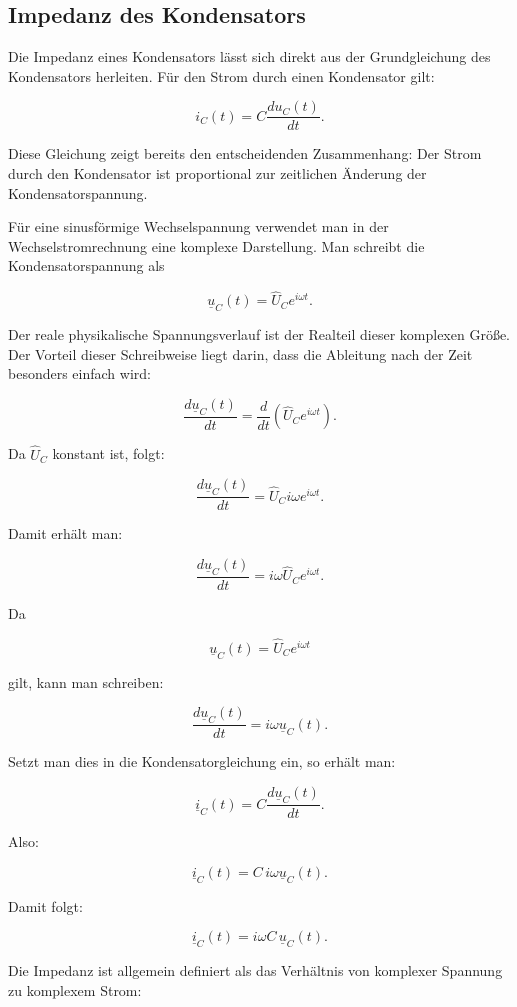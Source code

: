 \subsection{Impedanz des Kondensators}
\label{subsec:impedanz-des-kondensators}

Die Impedanz eines Kondensators lässt sich direkt aus der Grundgleichung des
Kondensators herleiten. Für den Strom durch einen Kondensator gilt:

\[
i_C(t)=C\frac{du_C(t)}{dt}.
\]

Diese Gleichung zeigt bereits den entscheidenden Zusammenhang:
Der Strom durch den Kondensator ist proportional zur zeitlichen Änderung der
Kondensatorspannung.

Für eine sinusförmige Wechselspannung verwendet man in der Wechselstromrechnung
eine komplexe Darstellung. Man schreibt die Kondensatorspannung als

\[
\underline{u}_C(t)=\hat U_C e^{i\omega t}.
\]

Der reale physikalische Spannungsverlauf ist der Realteil dieser komplexen
Größe. Der Vorteil dieser Schreibweise liegt darin, dass die Ableitung nach der
Zeit besonders einfach wird:

\[
\frac{d\underline{u}_C(t)}{dt}
=
\frac{d}{dt}\left(\hat U_C e^{i\omega t}\right).
\]

Da $\hat U_C$ konstant ist, folgt:

\[
\frac{d\underline{u}_C(t)}{dt}
=
\hat U_C i\omega e^{i\omega t}.
\]

Damit erhält man:

\[
\frac{d\underline{u}_C(t)}{dt}
=
i\omega \hat U_C e^{i\omega t}.
\]

Da

\[
\underline{u}_C(t)=\hat U_C e^{i\omega t}
\]

gilt, kann man schreiben:

\[
\frac{d\underline{u}_C(t)}{dt}
=
i\omega \underline{u}_C(t).
\]

Setzt man dies in die Kondensatorgleichung ein, so erhält man:

\[
\underline{i}_C(t)
=
C\frac{d\underline{u}_C(t)}{dt}.
\]

Also:

\[
\underline{i}_C(t)
=
C\,i\omega \underline{u}_C(t).
\]

Damit folgt:

\[
\underline{i}_C(t)
=
i\omega C\,\underline{u}_C(t).
\]

Die Impedanz ist allgemein definiert als das Verhältnis von komplexer Spannung
zu komplexem Strom:

